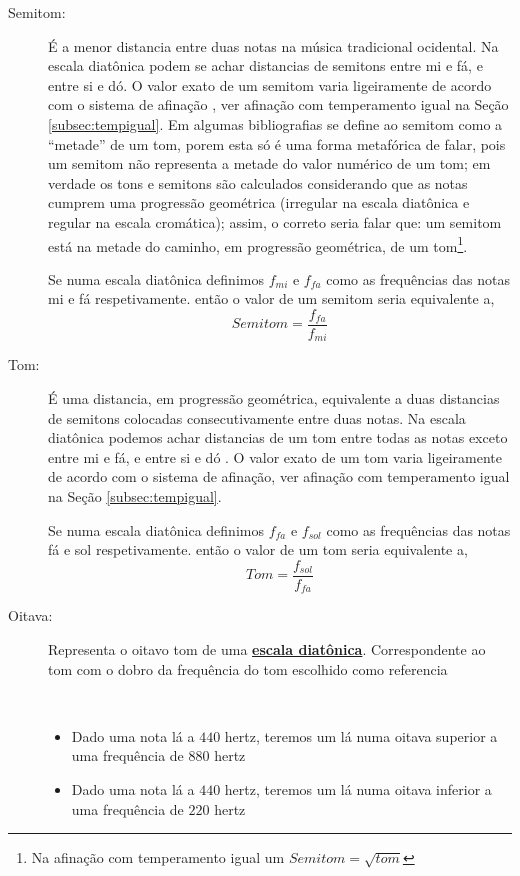 \begin{description}
\item [Semitom:] \label{sec:pos:Semitom}
É a menor distancia entre duas notas na música tradicional ocidental.
Na escala diatônica podem se achar distancias de semitons entre mi e fá, e entre si e dó.
O valor exato de um semitom varia ligeiramente de acordo com o sistema de afinação \cite[pp. 30]{cardoso1973curso}\cite[pp. 762]{apel1969harvard}, ver afinação com temperamento igual na Seção \ref{subsec:tempigual}. 
Em algumas bibliografias se define ao semitom como a ``metade'' de um tom, 
porem esta só é uma forma metafórica de falar, 
pois um semitom não representa a metade do valor numérico de um tom;
em verdade os tons e semitons são calculados considerando que as notas cumprem uma progressão geométrica
(irregular na escala diatônica e regular na escala cromática);
assim, o correto seria falar que: um semitom está na metade do caminho, em progressão geométrica, de um tom\footnote{Na 
afinação com temperamento igual um $Semitom=\sqrt{tom}$}.
\begin{example}
Se numa escala diatônica definimos $f_{mi}$ e $f_{fa}$ como as frequências das notas mi e fá respetivamente.
então o valor de um semitom seria equivalente a,
\begin{equation*}
Semitom=\frac{f_{fa}}{f_{mi}}
\end{equation*}
\end{example}

\item [Tom:] \label{sec:pos:TomDist}
É uma distancia, em progressão geométrica, equivalente a duas distancias de semitons colocadas consecutivamente entre duas notas.
Na escala diatônica podemos achar distancias de um tom entre todas as notas exceto entre mi e fá, e entre si e dó \cite[pp. 30]{cardoso1973curso}\cite[pp. 762]{apel1969harvard}.
O valor exato de um tom varia ligeiramente de acordo com o sistema de afinação, ver afinação com temperamento igual na Seção \ref{subsec:tempigual}. 
\begin{example}
Se numa escala diatônica definimos $f_{fa}$ e $f_{sol}$ como as frequências das notas fá e sol respetivamente.
então o valor de um tom seria equivalente a,
\begin{equation*}
Tom=\frac{f_{sol}}{f_{fa}}
\end{equation*}
\end{example}

\item [Oitava:] \label{sec:pos:Oitava}
Representa o oitavo tom de uma \hyperref[sec:pos:Diatonica]{\textbf{escala diatônica}}. 
Correspondente  ao tom com o dobro da frequência do tom escolhido como referencia \cite[pp. 589]{apel1969harvard}
\begin{example}~
\begin{itemize}
\item Dado uma nota lá a $440$ hertz, teremos um lá numa oitava superior a uma frequência de $880$ hertz  
\item Dado uma nota lá a $440$ hertz, teremos um lá numa oitava inferior a uma frequência de $220$ hertz  
\end{itemize}
\end{example}



\end{description}
